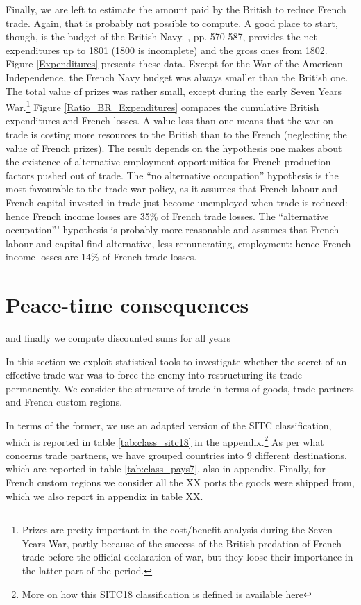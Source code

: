 \documentclass[12pt,a4paper,notitlepage,english]{article}
\begin{document}
Finally, we are left to estimate the amount paid by the British to reduce French trade. Again, that is probably not possible to compute. A good place to start, though, is the budget of the British Navy. \cite{mitchell1988}, pp. 570-587, provides the net expenditures up to 1801 (1800 is incomplete) and the gross ones from 1802.
Figure \ref{Expenditures} presents these data. Except for the War of the American Independence, the French Navy budget was always smaller than the British one. The total value of prizes was rather small, except during the early Seven Years War.\footnote{Prizes are pretty important in the cost/benefit analysis during the Seven Years War, partly because of the success of the British predation of French trade before the official declaration of war, but they loose their importance in the latter part of the period.}
Figure \ref{Ratio_BR_Expenditures} compares the cumulative British expenditures and French losses. A value less than one means that the war on trade is costing more resources to the British than to the French (neglecting the value of French prizes). 
The result depends on the hypothesis one makes about the existence of alternative employment opportunities for French production factors pushed out of trade. The ``no alternative occupation'' hypothesis is the most favourable to the trade war policy, as it assumes that French labour and French capital invested in trade just become unemployed when trade is reduced: hence French income losses are 35\% of French trade losses. The ``alternative occupation''' hypothesis is probably more reasonable and assumes that French labour and capital find alternative, less remunerating, employment: hence French income losses are 14\% of French trade losses.


\section{Peace-time consequences} \label{sec:empirical_analysis}


and finally we compute discounted sums for all years


In this section we exploit statistical tools to investigate whether the secret of an effective trade war was to force the enemy into restructuring its trade permanently. 
We consider the structure of trade in terms of goods, trade partners and French custom regions. 

In terms of the former, we use an adapted version of the SITC classification, which is reported in table \ref{tab:class_sitc18} in the appendix.\footnote{More on how this SITC18 classification is defined is available \href{http://toflit18.medialab.sciences-po.fr/\#/home}{here}} As per what concerns trade partners, we have grouped countries into 9 different destinations, which are reported in table \ref{tab:class_pays7}, also in appendix. Finally, for French custom regions we consider all the XX ports the goods were shipped from, which we also report in appendix in table XX. 
\end{document}
